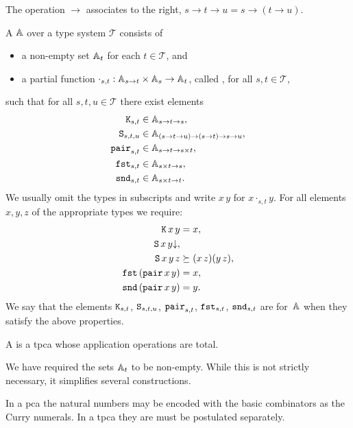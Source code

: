 The operation $\to$ associates to the right, $s \to t \to u = s \to (t \to u)$.

\begin{definition}
  A  $\AA$ over a type system $\mathcal{T}$ consists of
  \begin{itemize}
  \item a non-empty set $\AA_t$ for each $t \in \mathcal{T}$, and
  \item a partial function $\cdot_{s,t} : \AA_{s \to t} \times \AA_s \to
    \AA_t$, called , for all $s, t \in \mathcal{T}$,
  \end{itemize}
  such that for all $s, t, u \in \mathcal{T}$ there exist elements
  \begin{align*}
    \combK_{s,t} &\in \AA_{s \to t \to s}, \\
    \combS_{s,t,u} &\in \AA_{(s \to t \to u) \to (s \to t) \to s \to u}, \\
    \combPair_{s,t} &\in \AA_{s \to t \to s \times t}, \\
    \combFst_{s,t} &\in \AA_{s \times t \to s}, \\
    \combSnd_{s,t} &\in \AA_{s \times t \to t}.
  \end{align*}
  We usually omit the types in subscripts and write $x \, y$ for $x \cdot_{s,t} y$.
  For all elements $x, y, z$ of the appropriate types we require:
  \begin{align*}
    \combK \, x \, y &= x, \\
    \defined{\combS \, x \, y}, & \\
    \combS \, x \, y \, z &\klgeq  (x \, z) (y \, z), \\
    \combFst \, (\combPair \, x \, y) &= x, \\
    \combSnd \, (\combPair \, x \, y) &= y.
  \end{align*}
  We say that the elements $\combK_{s,t}$, $\combS_{s,t,u}$,
  $\combPair_{s,t}$, $\combFst_{s,t}$, $\combSnd_{s,t}$ are
   for~$\AA$ when they satisfy the above properties.

  A  is a tpca whose application operations are total.
\end{definition}

We have required the sets $\AA_t$ to be non-empty. While this is not
strictly necessary, it simplifies several constructions.

In a pca the natural numbers may be encoded with the basic combinators as the Curry numerals. In a tpca they are must be postulated separately.

